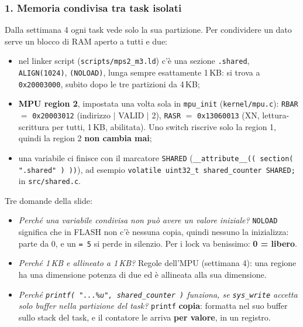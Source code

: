\subsubsection*{1. Memoria condivisa tra task isolati}
Dalla settimana 4 ogni task vede solo la sua partizione. Per condividere un dato serve un blocco di RAM aperto a tutti e due:
\begin{itemize}
    \item nel linker script (\texttt{scripts/mps2\_m3.ld}) c'è una sezione \texttt{.shared}, \texttt{ALIGN(1024)}, \texttt{(NOLOAD)}, lunga sempre esattamente 1\,KB: si trova a \texttt{0x20003000}, subito dopo le tre partizioni da 4\,KB;
    \item \textbf{MPU region 2}, impostata una volta sola in \texttt{mpu\_init} (\texttt{kernel/mpu.c}): \texttt{RBAR} $=$ \texttt{0x20003012} (indirizzo $|$ VALID $|$ 2), \texttt{RASR} $=$ \texttt{0x13060013} (XN, lettura-scrittura per tutti, 1\,KB, abilitata). Uno switch riscrive solo la region 1, quindi la region 2 \textbf{non cambia mai};
    \item una variabile ci finisce con il marcatore \texttt{SHARED} (\texttt{\_\_attribute\_\_(( section( ".shared" ) ))}), ad esempio \texttt{volatile uint32\_t shared\_counter SHARED;} in \texttt{src/shared.c}.
\end{itemize}
Tre domande della slide:
\begin{itemize}
    \item \emph{Perché una variabile condivisa non può avere un valore iniziale?} \texttt{NOLOAD} significa che in FLASH non c'è nessuna copia, quindi nessuno la inizializza: parte da 0, e un \texttt{= 5} si perde in silenzio. Per i lock va benissimo: \textbf{0 = libero}.
    \item \emph{Perché 1\,KB e allineato a 1\,KB?} Regole dell'MPU (settimana 4): una regione ha una dimensione potenza di due ed è allineata alla sua dimensione.
    \item \emph{Perché \texttt{printf( "...\%u", shared\_counter )} funziona, se \texttt{sys\_write} accetta solo buffer nella partizione del task?} \texttt{printf} \textbf{copia}: formatta nel suo buffer sullo stack del task, e il contatore le arriva \textbf{per valore}, in un registro.
\end{itemize}

